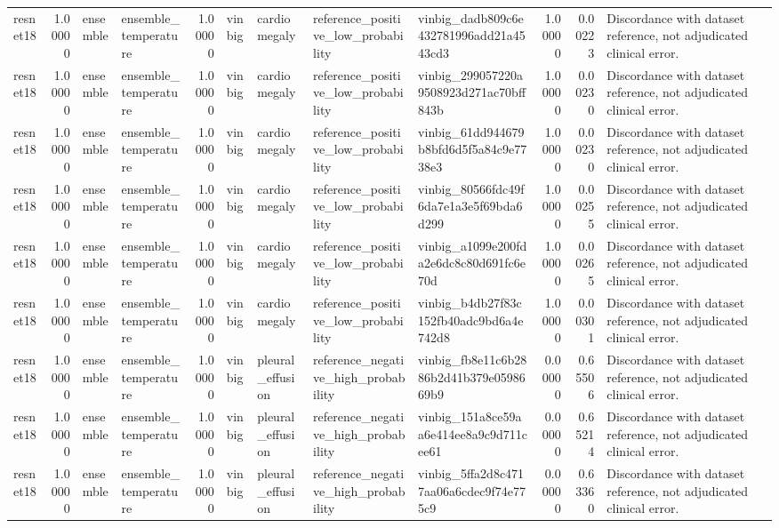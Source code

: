 \begin{tabular}{lrllrllllrrl}
resnet18 & 1.00000 & ensemble & ensemble\_temperature & 1.00000 & vinbig & cardiomegaly & reference\_positive\_low\_probability & vinbig\_dadb809c6e432781996add21a4543cd3 & 1.00000 & 0.00223 & Discordance with dataset reference, not adjudicated clinical error. \\
resnet18 & 1.00000 & ensemble & ensemble\_temperature & 1.00000 & vinbig & cardiomegaly & reference\_positive\_low\_probability & vinbig\_299057220a9508923d271ac70bff843b & 1.00000 & 0.00230 & Discordance with dataset reference, not adjudicated clinical error. \\
resnet18 & 1.00000 & ensemble & ensemble\_temperature & 1.00000 & vinbig & cardiomegaly & reference\_positive\_low\_probability & vinbig\_61dd944679b8bfd6d5f5a84c9e7738e3 & 1.00000 & 0.00230 & Discordance with dataset reference, not adjudicated clinical error. \\
resnet18 & 1.00000 & ensemble & ensemble\_temperature & 1.00000 & vinbig & cardiomegaly & reference\_positive\_low\_probability & vinbig\_80566fdc49f6da7e1a3e5f69bda6d299 & 1.00000 & 0.00255 & Discordance with dataset reference, not adjudicated clinical error. \\
resnet18 & 1.00000 & ensemble & ensemble\_temperature & 1.00000 & vinbig & cardiomegaly & reference\_positive\_low\_probability & vinbig\_a1099e200fda2e6dc8c80d691fc6e70d & 1.00000 & 0.00265 & Discordance with dataset reference, not adjudicated clinical error. \\
resnet18 & 1.00000 & ensemble & ensemble\_temperature & 1.00000 & vinbig & cardiomegaly & reference\_positive\_low\_probability & vinbig\_b4db27f83c152fb40adc9bd6a4e742d8 & 1.00000 & 0.00301 & Discordance with dataset reference, not adjudicated clinical error. \\
resnet18 & 1.00000 & ensemble & ensemble\_temperature & 1.00000 & vinbig & pleural\_effusion & reference\_negative\_high\_probability & vinbig\_fb8e11c6b2886b2d41b379e0598669b9 & 0.00000 & 0.65506 & Discordance with dataset reference, not adjudicated clinical error. \\
resnet18 & 1.00000 & ensemble & ensemble\_temperature & 1.00000 & vinbig & pleural\_effusion & reference\_negative\_high\_probability & vinbig\_151a8ce59aa6e414ee8a9c9d711cee61 & 0.00000 & 0.65214 & Discordance with dataset reference, not adjudicated clinical error. \\
resnet18 & 1.00000 & ensemble & ensemble\_temperature & 1.00000 & vinbig & pleural\_effusion & reference\_negative\_high\_probability & vinbig\_5ffa2d8c4717aa06a6cdec9f74e775c9 & 0.00000 & 0.63360 & Discordance with dataset reference, not adjudicated clinical error. \\

\end{tabular}
